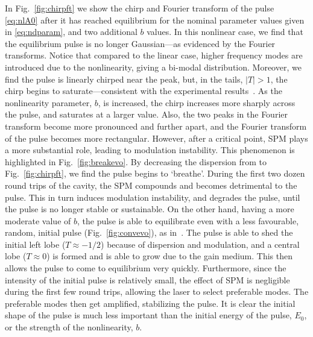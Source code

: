 \documentclass[9pt,twocolumn,twoside]{osajnl}
\begin{document}
In Fig.~\ref{fig:chirpft} we show the chirp and Fourier transform of the pulse \eqref{eq:nlA0} after it has reached equilibrium for the nominal parameter values given in \eqref{eq:ndparam}, and two additional $b$ values. In this nonlinear case, we find that the equilibrium pulse is no longer Gaussian---as evidenced by the Fourier transforms. Notice that compared to the linear case, higher frequency modes are introduced due to the nonlinearity, giving a bi-modal distribution. Moreover, we find the pulse is linearly chirped near the peak, but, in the tails, $|T| > 1$, the chirp begins to saturate---consistent with the experimental results~\cite{chen2008, rothenberg1989b, tomlinson1985}. As the nonlinearity parameter, $b$, is increased, the chirp increases more sharply across the pulse, and saturates at a larger value. Also, the two peaks in the Fourier transform become more pronounced and further apart, and the Fourier transform of the pulse becomes more rectangular. However, after a critical point, SPM plays a more substantial role, leading to modulation instability. This phenomenon is highlighted in Fig.~\ref{fig:breakevo}. By decreasing the dispersion from to Fig.~\ref{fig:chirpft}, we find the pulse begins to `breathe'. During the first two dozen round trips of the cavity, the SPM compounds and becomes detrimental to the pulse. This in turn induces modulation instability, and degrades the pulse, until the pulse is no longer stable or sustainable. On the other hand, having a more moderate value of $b$, the pulse is able to equilibrate even with a less favourable, random, initial pulse (Fig.~\ref{fig:convevo}), as in~\cite{meng2020}. The pulse is able to shed the initial left lobe ($T \approx -1 / 2$) because of dispersion and modulation, and a central lobe ($T \approx 0$) is formed and is able to grow due to the gain medium. This then allows the pulse to come to equilibrium very quickly. Furthermore, since the intensity of the initial pulse is relatively small, the effect of SPM is negligible during the first few round trips, allowing the laser to select preferable modes. The preferable modes then get amplified, stabilizing the pulse. It is clear the initial shape of the pulse is much less important than the initial energy of the pulse, $E_0$, or the strength of the nonlinearity, $b$.
\end{document}
